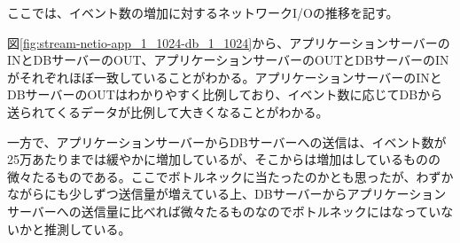 \documentclass[../../../../../main]{subfiles}
\begin{document}
    \label{subsubsec:result-streaming-only-limit-diskio}

    ここでは、イベント数の増加に対するネットワークI/Oの推移を記す。

    

    図\ref{fig:stream-netio-app_1_1024-db_1_1024}から、アプリケーションサーバーのINとDBサーバーのOUT、アプリケーションサーバーのOUTとDBサーバーのINがそれぞれほぼ一致していることがわかる。アプリケーションサーバーのINとDBサーバーのOUTはわかりやすく比例しており、イベント数に応じてDBから送られてくるデータが比例して大きくなることがわかる。

    一方で、アプリケーションサーバーからDBサーバーへの送信は、イベント数が25万あたりまでは緩やかに増加しているが、そこからは増加はしているものの微々たるものである。ここでボトルネックに当たったのかとも思ったが、わずかながらにも少しずつ送信量が増えている上、DBサーバーからアプリケーションサーバーへの送信量に比べれば微々たるものなのでボトルネックにはなっていないかと推測している。
\end{document}
